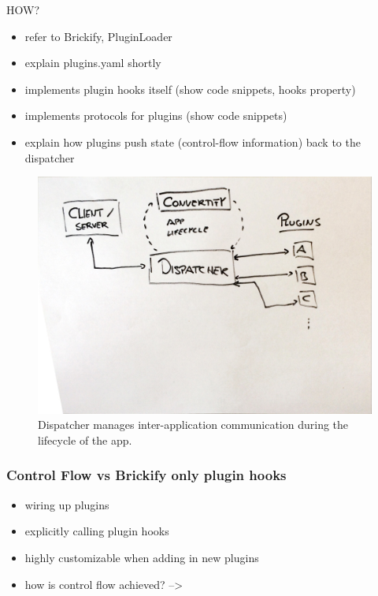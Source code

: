 \documentclass[../ClassicThesis.tex]{subfiles}
\begin{document}
HOW?

\begin{itemize}
\item refer to Brickify, PluginLoader
\item explain plugins.yaml shortly
\item implements plugin hooks itself (show code snippets, hooks property)

\item implements protocols for plugins (show code snippets)
\item explain how plugins push state (control-flow information) back to the
  dispatcher
\end{itemize}

\begin{figure}
  \centering
  \includegraphics[width=1\columnwidth]{Images/03-architecture_overview_dispatcher.jpg}
  \caption{Dispatcher manages inter-application communication during the
    lifecycle of the app.}
  \label{fig:architecture_overview_dispatcher}
\end{figure}


\subsubsection{Control Flow vs Brickify only plugin hooks}

\begin{itemize}
\item wiring up plugins
\item explicitly calling plugin hooks
\item highly customizable when adding in new plugins
\item how is control flow achieved? -->
\end{itemize}
\end{document}
